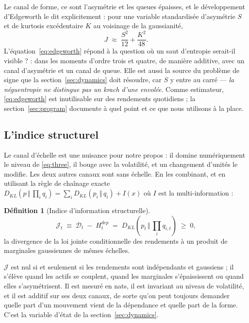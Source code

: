 \documentclass[11pt]{article}
\theoremstyle{definition}
\newtheorem{definition}{Définition}
\theoremstyle{remark}
\newcommand{\JJ}{\mathcal{J}}
\newcommand{\DD}{\mathcal{D}}
\newcommand{\KL}[2]{D_{KL}\!\left(#1\,\Vert\,#2\right)}
\begin{document}
Le canal de forme, ce sont l'asymétrie et les queues épaisses, et le
développement d'Edgeworth le dit explicitement : pour une variable standardisée
d'asymétrie $S$ et de kurtosis excédentaire $K$ au voisinage de la gaussianité,
\begin{equation}
\label{eq:edgeworth}
J \;\approx\; \frac{S^2}{12} + \frac{K^2}{48}.
\end{equation}
L'équation~\eqref{eq:edgeworth} répond à la question \og où un saut d'entropie
serait-il visible ? \fg{} : dans les moments d'ordre trois et quatre, de manière
additive, avec un canal d'asymétrie et un canal de queue. Elle est aussi la
source du problème de signe que la section~\ref{sec:dynamics} doit résoudre, car
$S$ y entre au carré --- \emph{la néguentropie ne distingue pas un krach d'une
envolée}. Comme estimateur, \eqref{eq:edgeworth} est inutilisable sur des
rendements quotidiens ; la section~\ref{sec:program} documente à quel point et
ce que nous utilisons à la place.

\subsection{L'indice structurel}

Le canal d'échelle est une nuisance pour notre propos : il domine numériquement
le niveau de \eqref{eq:three}, il bouge avec la volatilité, et un changement
d'unités le modifie. Les deux autres canaux sont sans échelle. En les combinant,
et en utilisant la règle de chaînage exacte
$\KL{p}{\prod_i q_i} = \sum_i \KL{p_i}{q_i} + I(x)$ où $I$ est la
multi-information :

\begin{definition}[Indice d'information structurelle]
\label{def:J}
\begin{equation}
\JJ_t \;\equiv\; \DD_t \;-\; H^{dep}_t \;=\; \KL{p_t}{\textstyle\prod_i q_{i,t}} \;\ge\; 0 ,
\end{equation}
la divergence de la loi jointe conditionnelle des rendements à un produit de
marginales gaussiennes de mêmes échelles.
\end{definition}

$\JJ$ est nul si et seulement si les rendements sont indépendants et gaussiens ;
il s'élève quand les actifs se couplent, quand les marginales s'épaississent ou
quand elles s'asymétrisent. Il est mesuré en nats, il est invariant au niveau de
volatilité, et il est additif sur ses deux canaux, de sorte qu'on peut toujours
demander quelle part d'un mouvement vient de la dépendance et quelle part de la
forme. C'est la variable d'état de la section~\ref{sec:dynamics}.
\end{document}
